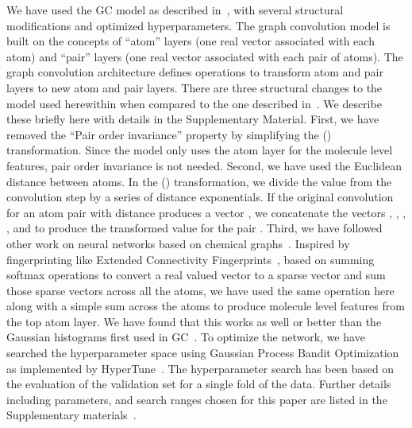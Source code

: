 \documentclass[reprint, superscriptaddress,
amsmath,amssymb, aps, prb,
]{revtex4-1}
\begin{document}
{We have used the GC model as described in~\citet{kearnes2016molecular}, with several structural modifications and optimized hyperparameters. 
The graph convolution model is built on the concepts of ``atom'' layers (one real vector associated with each atom) and ``pair'' layers (one real vector associated with each pair of atoms). 
The graph convolution architecture defines operations to transform atom and pair layers to new atom and pair layers. 
There are three structural changes to the model used herewithin when compared to the one described in~\citet{kearnes2016molecular}. 
We describe these briefly here with details in the Supplementary Material. 
First, we have removed the ``Pair order invariance'' property by simplifying the () transformation.  
Since the model only uses the atom layer for the molecule level features, pair order invariance is not needed.
Second, we have used the Euclidean distance between atoms. 
In the () transformation, we divide the value from the convolution step by a series of distance exponentials. 
If the original convolution for an atom pair  with distance  produces a vector , we concatenate the vectors , , , , and  to produce the transformed value for the pair .
Third, we have followed other work on neural networks based on chemical graphs~\cite{duvenaud2015convolutional}. 
Inspired by fingerprinting like Extended Connectivity Fingerprints~\cite{rogers2010extended}, 
based on summing softmax operations to convert a real valued vector to a sparse vector and sum those sparse vectors across all the atoms, 
we have used the same operation here along with a simple sum across the atoms to produce molecule level features from the top atom layer. 
We have found that this works as well or better than the Gaussian histograms first used in GC~\cite{kearnes2016molecular}.
To optimize the network, we have searched the hyperparameter space using Gaussian Process Bandit Optimization~\cite{JMLR:v15:desautels14a} as implemented by HyperTune~\cite{hypertune}. 
The hyperparameter search has been based on the evaluation of the validation set for a single fold of the data.
Further details including parameters, and search ranges chosen for this paper are listed in the Supplementary materials~\cite{supplementary}.

}
\end{document}
